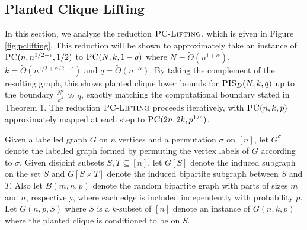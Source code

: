 \subsection{Planted Clique Lifting}

In this section, we analyze the reduction $\textsc{PC-Lifting}$, which is given in Figure \ref{fig:pclifting}. This reduction will be shown to approximately take an instance of $\textsc{PC}(n, n^{1/2-\epsilon}, 1/2)$ to $\textsc{PC}(N, k, 1 - q)$ where $N = \tilde{\Theta}(n^{1 + \alpha})$, $k = \tilde{\Theta}(n^{1/2 + \alpha/2 - \epsilon})$ and $q = \tilde{\Theta}(n^{-\alpha})$. By taking the complement of the resulting graph, this shows planted clique lower bounds for $\textsc{PIS}_D(N, k, q)$ up to the boundary $\frac{N^2}{k^4} \gg q$, exactly matching the computational boundary stated in Theorem 1. The reduction $\textsc{PC-Lifting}$ proceeds iteratively, with $\textsc{PC}(n, k, p)$ approximately mapped at each step to $\textsc{PC}(2n, 2k, p^{1/4})$.

Given a labelled graph $G$ on $n$ vertices and a permutation $\sigma$ on $[n]$, let $G^{\sigma}$ denote the labelled graph formed by permuting the vertex labels of $G$ according to $\sigma$. Given disjoint subsets $S, T \subseteq [n]$, let $G[S]$ denote the induced subgraph on the set $S$ and $G[S \times T]$ denote the induced bipartite subgraph between $S$ and $T$. Also let $B(m, n, p)$ denote the random bipartite graph with parts of sizes $m$ and $n$, respectively, where each edge is included independently with probability $p$. Let $G(n, p, S)$ where $S$ is a $k$-subset of $[n]$ denote an instance of $G(n, k, p)$ where the planted clique is conditioned to be on $S$.

